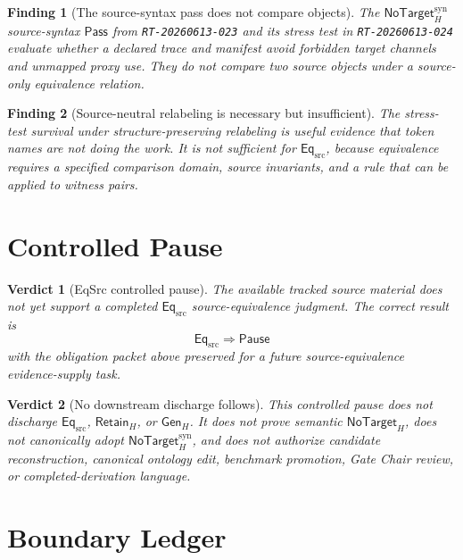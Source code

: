 \documentclass[11pt]{article}
\newcommand{\EqSrc}{\mathsf{Eq}_{\mathrm{src}}}
\newcommand{\GenH}{\mathsf{Gen}_{H}}
\newcommand{\RetainH}{\mathsf{Retain}_{H}}
\newcommand{\NoTargetH}{\mathsf{NoTarget}_{H}}
\newcommand{\NoTargetSyn}{\mathsf{NoTarget}_{H}^{\mathrm{syn}}}
\newcommand{\Pass}{\mathsf{Pass}}
\newcommand{\Pause}{\mathsf{Pause}}
\newtheorem{finding}{Finding}
\newtheorem{verdict}{Verdict}
\begin{document}
\begin{finding}[The source-syntax pass does not compare objects]
The \(\NoTargetSyn\) source-syntax \(\Pass\) from \texttt{RT-20260613-023}
and its stress test in \texttt{RT-20260613-024} evaluate whether a declared
trace and manifest avoid forbidden target channels and unmapped proxy use.
They do not compare two source objects under a source-only equivalence
relation.
\end{finding}

\begin{finding}[Source-neutral relabeling is necessary but insufficient]
The stress-test survival under structure-preserving relabeling is useful
evidence that token names are not doing the work. It is not sufficient for
\(\EqSrc\), because equivalence requires a specified comparison domain,
source invariants, and a rule that can be applied to witness pairs.
\end{finding}

\section{Controlled Pause}

\begin{verdict}[EqSrc controlled pause]
The available tracked source material does not yet support a completed
\(\EqSrc\) source-equivalence judgment. The correct result is
\[
    \EqSrc \Rightarrow \Pause
\]
with the obligation packet above preserved for a future source-equivalence
evidence-supply task.
\end{verdict}

\begin{verdict}[No downstream discharge follows]
This controlled pause does not discharge \(\EqSrc\), \(\RetainH\), or
\(\GenH\). It does not prove semantic \(\NoTargetH\), does not canonically
adopt \(\NoTargetSyn\), and does not authorize candidate reconstruction,
canonical ontology edit, benchmark promotion, Gate Chair review, or
completed-derivation language.
\end{verdict}

\section{Boundary Ledger}
\end{document}
